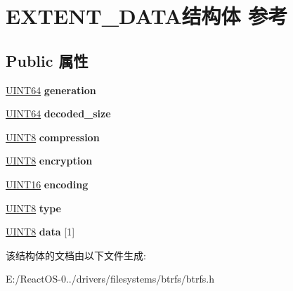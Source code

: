 \hypertarget{struct_e_x_t_e_n_t___d_a_t_a}{}\section{E\+X\+T\+E\+N\+T\+\_\+\+D\+A\+T\+A结构体 参考}
\label{struct_e_x_t_e_n_t___d_a_t_a}
\subsection*{Public 属性}
\begin{DoxyCompactItemize}
\item 
\mbox{\label{struct_e_x_t_e_n_t___d_a_t_a_a6a18b35a97f447edb1bd55e50cafc3e6}} 
\hyperlink{_processor_bind_8h_a57be03562867144161c1bfee95ca8f7c}{U\+I\+N\+T64} {\bfseries generation}
\item 
\mbox{\label{struct_e_x_t_e_n_t___d_a_t_a_af4a6318f03fd17a5c0a0c661ae735205}} 
\hyperlink{_processor_bind_8h_a57be03562867144161c1bfee95ca8f7c}{U\+I\+N\+T64} {\bfseries decoded\+\_\+size}
\item 
\mbox{\label{struct_e_x_t_e_n_t___d_a_t_a_a61796c1f4c70459488e02472416bb9b8}} 
\hyperlink{_processor_bind_8h_ab27e9918b538ce9d8ca692479b375b6a}{U\+I\+N\+T8} {\bfseries compression}
\item 
\mbox{\label{struct_e_x_t_e_n_t___d_a_t_a_adc6caef7eb2bab57adfd528f09c299f8}} 
\hyperlink{_processor_bind_8h_ab27e9918b538ce9d8ca692479b375b6a}{U\+I\+N\+T8} {\bfseries encryption}
\item 
\mbox{\label{struct_e_x_t_e_n_t___d_a_t_a_a6773a230f8ef1d9efeebc268eab21f54}} 
\hyperlink{_processor_bind_8h_a09f1a1fb2293e33483cc8d44aefb1eb1}{U\+I\+N\+T16} {\bfseries encoding}
\item 
\mbox{\label{struct_e_x_t_e_n_t___d_a_t_a_a47ae23b91fb66b92489787ae677a10af}} 
\hyperlink{_processor_bind_8h_ab27e9918b538ce9d8ca692479b375b6a}{U\+I\+N\+T8} {\bfseries type}
\item 
\mbox{\label{struct_e_x_t_e_n_t___d_a_t_a_a8c9f0a443ecacdb9d0eefbd233da5cbb}} 
\hyperlink{_processor_bind_8h_ab27e9918b538ce9d8ca692479b375b6a}{U\+I\+N\+T8} {\bfseries data} \mbox{[}1\mbox{]}
\end{DoxyCompactItemize}


该结构体的文档由以下文件生成\+:\begin{DoxyCompactItemize}
\item 
E\+:/\+React\+O\+S-\/0../drivers/filesystems/btrfs/btrfs.\+h\end{DoxyCompactItemize}
